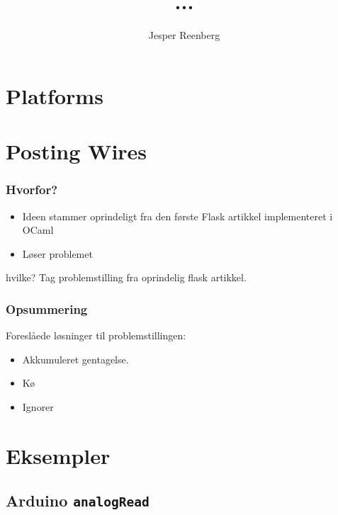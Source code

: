 \documentclass{beamer}
\title{...}
\author{Jesper Reenberg}
\begin{document}
\frame{\titlepage}

\section[Outline]{}
\frame{\tableofcontents}


\section{Platforms}

\section{Posting Wires}

\begin{frame}
  \frametitle{Hvorfor?}

  \begin{itemize}
  \item Ideen stammer oprindeligt fra den første Flask artikkel implementeret i
    OCaml

  \item Løser problemet
  \end{itemize}

  hvilke? Tag problemstilling fra oprindelig flask artikkel.

\end{frame}


  
\begin{frame}
  \frametitle{Opsummering}

  Foreslåede løsninger til problemstillingen:

  \begin{itemize}
  \item Akkumuleret gentagelse.
  \item Kø
  \item Ignorer
  \end{itemize}

\end{frame}




\section{Eksempler}
\subsection{Arduino \texttt{analogRead}}
\end{document}
